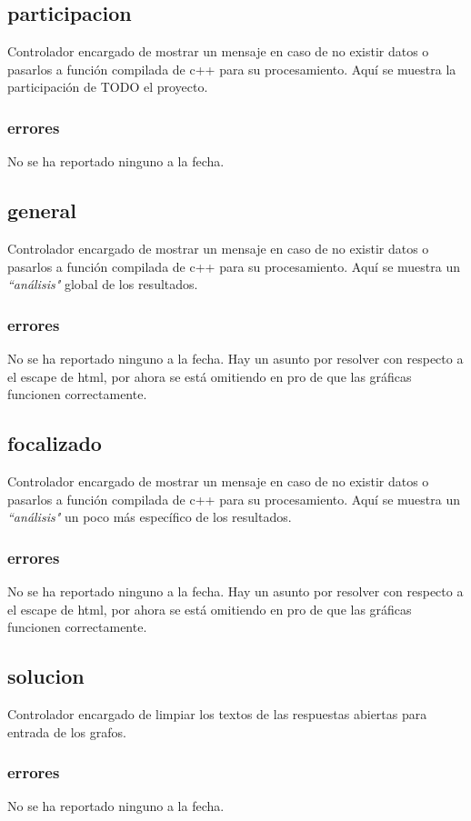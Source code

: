\documentclass[10pt,a4paper]{book}
\begin{document}
	\subsection{participacion}
	Controlador encargado de mostrar un mensaje en caso de no existir datos o pasarlos a función compilada de c++ para su procesamiento. Aquí se muestra la participación de TODO el proyecto.
	\subsubsection{errores}
	No se ha reportado ninguno a la fecha.

	\subsection{general}
	Controlador encargado de mostrar un mensaje en caso de no existir datos o pasarlos a función compilada de c++ para su procesamiento. Aquí se muestra un \textit{``análisis"} global de los resultados.
	\subsubsection{errores}
	No se ha reportado ninguno a la fecha. Hay un asunto por resolver con respecto a el escape de html, por ahora se está omitiendo en pro de que las gráficas funcionen correctamente.

	\subsection{focalizado}
	Controlador encargado de mostrar un mensaje en caso de no existir datos o pasarlos a función compilada de c++ para su procesamiento. Aquí se muestra un \textit{``análisis"} un poco más específico de los resultados.
	\subsubsection{errores}
	No se ha reportado ninguno a la fecha. Hay un asunto por resolver con respecto a el escape de html, por ahora se está omitiendo en pro de que las gráficas funcionen correctamente.

	\subsection{solucion}
	Controlador encargado de limpiar los textos de las respuestas abiertas para entrada de los grafos.
	\subsubsection{errores}
	No se ha reportado ninguno a la fecha.
\end{document}
